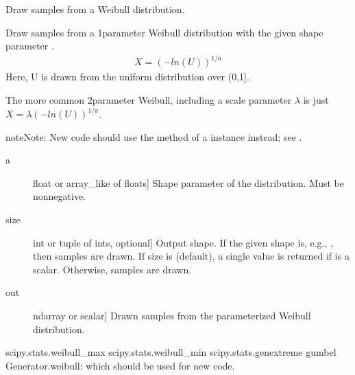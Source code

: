 \documentclass[letterpaper,10pt,english]{sphinxmanual}
\begin{document}
\begin{fulllineitems}
\label{\detokenize{infrapy.utils:infrapy.utils.ref2sac.weibull}}
Draw samples from a Weibull distribution.

Draw samples from a 1\sphinxhyphen{}parameter Weibull distribution with the given
shape parameter .
\begin{equation*}
\begin{split}X = (-ln(U))^{1/a}\end{split}
\end{equation*}
Here, U is drawn from the uniform distribution over (0,1{]}.

The more common 2\sphinxhyphen{}parameter Weibull, including a scale parameter
\(\lambda\) is just \(X = \lambda(-ln(U))^{1/a}\).

\begin{sphinxadmonition}{note}{Note:}
New code should use the  method of a 
instance instead; see .
\end{sphinxadmonition}
\begin{description}
\item[{a}] \leavevmode{[}float or array\_like of floats{]}
Shape parameter of the distribution.  Must be nonnegative.

\item[{size}] \leavevmode{[}int or tuple of ints, optional{]}
Output shape.  If the given shape is, e.g., , then
 samples are drawn.  If size is  (default),
a single value is returned if  is a scalar.  Otherwise,
 samples are drawn.

\end{description}
\begin{description}
\item[{out}] \leavevmode{[}ndarray or scalar{]}
Drawn samples from the parameterized Weibull distribution.

\end{description}

scipy.stats.weibull\_max
scipy.stats.weibull\_min
scipy.stats.genextreme
gumbel
Generator.weibull: which should be used for new code.


\end{fulllineitems}
\end{document}
